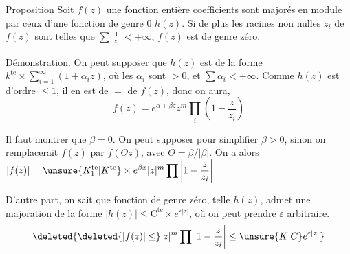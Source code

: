 
\uline{Proposition} \quad Soit $f(z)$ une fonction entière      coefficients sont majorés en module par ceux d'une fonction de genre $0$ $h(z)$. Si de plus les racines non nulles $z_i$ de $f(z)$ sont telles que $\sum\frac{1}{|z_i|}<+\infty$, $f(z)$ est de genre zéro.


Démonstration. On peut supposer que $h(z)$ est de la forme $k^{\mathrm{te}}\times\sum_{i=1}^{\infty}(1+\alpha_i z)$, où les $\alpha_i$ sont $>0$, et $\sum\alpha_i<+\infty$. Comme $h(z)$ est d'\uline{ordre} $\leq1$, il en est de $=$ de $f(z)$, donc on aura,
\[
f(z)=e^{\alpha+\beta z}z^m\prod_i\left(1-\frac{z}{z_i}\right)
\]

Il faut montrer que $\beta=0$. On peut supposer pour simplifier $\beta>0$, sinon on remplacerait $f(z)$ par $f(\Theta z)$, avec $\Theta=\beta/|\beta|$. On a alors $\displaystyle |f(z)|=\unsure{K_1^{\mathrm{te}}|K^{\mathrm{te}}}\times e^{\beta x}|z|^m\prod\left|1-\frac{z}{z_i}\right|$

D'autre part, on sait que   fonction de genre zéro, telle $h(z)$, admet une majoration de la forme $|h(z)|\leq\mathrm C^{\mathrm{te}}\times e^{\varepsilon|z|}$, où on peut prendre $\varepsilon$ arbitraire. 
\[
\deleted{\deleted{|f(z)|\leq}|z|^m\prod\left|1-\frac{z}{z_i}\right|\leq\unsure{K|C}e^{\varepsilon|z|}}
\]
